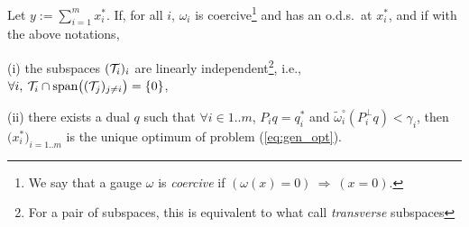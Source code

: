 \documentclass{article}
\begin{document}
\begin{prop}
\label{prop:genunicity}
Let $y:=\sum_{i=1}^m x_{i}^*$. If, for all $i$, $\omega_i$ is coercive\footnote{We say that a gauge $\omega$ is \emph{coercive} if $ ( \omega(x)=0 ) \: \Rightarrow\: (x=0)$.} and has an o.d.s.\ at $x_i^*$, and if with the above notations, 
\BET
\item[(i)] the subspaces $(\mathcal{T}_i)_i$ are linearly independent\footnote{For a pair of subspaces, this is equivalent to what \citet{chandrasekaran2011rank} call \emph{transverse} subspaces}, i.e., $\forall i, \: \mathcal{T}_i \cap \text{span}\big ( (\mathcal{T}_j)_{j\neq i}\big) =\{0\}$,
\item[(ii)] there exists a dual $q$ such that $\forall i\in 1..m$, $P_i q=q_i^*$ and $\widetilde{\omega}^{\circ}_i(P_i^{\perp} q) < \gamma_i$,
\EET
then $\big(x_{i}^*\big)_{i=1..m}$ is the unique optimum of problem (\ref{eq:gen_opt}).
\end{prop}
\end{document}

